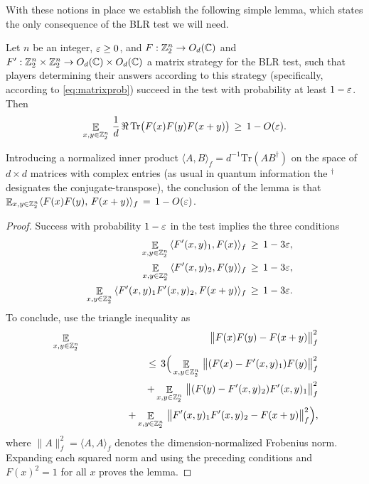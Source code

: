 With these notions in place we establish the following simple lemma, which states the only consequence of the BLR test we will need. 

\begin{lemma}\label{lem:blr-test}
Let $n$ be an integer, $\varepsilon\geq 0$, and $F:\mathbb{Z}_2^n\to O_d(\mathbb{C})$ and $F':\mathbb{Z}_2^n \times \mathbb{Z}_2^n  \to O_d(\mathbb{C})\times O_d(\mathbb{C})$ a matrix strategy for the BLR test, such that players determining their answers according to this strategy (specifically, according to \eqref{eq:matrixprob}) succeed in the test with probability at least $1-\varepsilon$. Then
$$
\mathop{\mathbb{E}}\displaylimits_{x,y\in \mathbb{Z}_2^n}\,\frac{1}{d}\, \Re\,\mathrm{Tr}\big( F(x)F(y)F(x+y)\big) \,\geq\, 1-O(\varepsilon).
$$
\end{lemma}

Introducing a normalized inner product $\langle A,B\rangle_f = d^{-1} \mathrm{Tr}(AB^\dagger)$ on the space of $d\times d$ matrices with complex entries (as usual in quantum information the $^\dagger$ designates the conjugate-transpose), the conclusion of the lemma is that $\mathop{\mathbb{E}}\displaylimits_{x,y\in \mathbb{Z}_2^n} \langle F(x)F(y),\,F(x+y)\rangle_f \,=\, 1-O(\varepsilon)$.

\begin{proof}
Success with probability $1-\varepsilon$ in the test implies the three conditions
\begin{eqnarray*}
&&\mathop{\mathbb{E}}\displaylimits_{x,y\in \mathbb{Z}_2^n} \, \langle F'(x,y)_1,F(x)\rangle_f \,\geq\, 1-3\varepsilon,\\
&&\mathop{\mathbb{E}}\displaylimits_{x,y\in \mathbb{Z}_2^n} \, \langle F'(x,y)_2,F(y)\rangle_f \,\geq\, 1-3\varepsilon,\\
&&\mathop{\mathbb{E}}\displaylimits_{x,y\in \mathbb{Z}_2^n} \, \langle F'(x,y)_1F'(x,y)_2,F(x+y)\rangle_f \,\geq\, 1-3\varepsilon.
\end{eqnarray*}
To conclude, use the triangle inequality as
\begin{eqnarray*}
&\mathop{\mathbb{E}}\displaylimits_{x,y\in \mathbb{Z}_2^n} & \big\|F(x)F(y)-F(x+y) \big\|_f^2 \\
& &\qquad\leq \,3\Big(\mathop{\mathbb{E}}\displaylimits_{x,y\in \mathbb{Z}_2^n} \, \big\|(F(x)-F'(x,y)_1)F(y) \big\|_f^2\\
&& \qquad\qquad + \mathop{\mathbb{E}}\displaylimits_{x,y\in \mathbb{Z}_2^n} \, \big\|(F(y)-F'(x,y)_2)F'(x,y)_1 \big\|_f^2\\
&&\qquad\qquad+\mathop{\mathbb{E}}\displaylimits_{x,y\in \mathbb{Z}_2^n} \, \big\|F'(x,y)_1F'(x,y)_2-F(x+y) \big\|_f^2\Big),
\end{eqnarray*}
where $\|A\|_f^2 = \langle A,A\rangle_f$ denotes the dimension-normalized Frobenius norm. 
Expanding each squared norm and using the preceding conditions and $F(x)^2=1$ for all $x$ proves the lemma. 
\end{proof}

